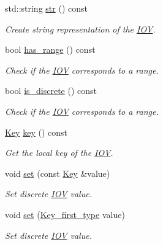 \begin{DoxyCompactItemize}
std\+::string \hyperlink{class_d_d4hep_1_1_i_o_v_a07992c19b3f256286999cf9b3edade48}{str} () const
\begin{DoxyCompactList}\small\item\em Create string representation of the \hyperlink{class_d_d4hep_1_1_i_o_v}{I\+OV}. \end{DoxyCompactList}\item 
bool \hyperlink{class_d_d4hep_1_1_i_o_v_aac9c5f6a22219991896f6a846b3f3649}{has\+\_\+range} () const
\begin{DoxyCompactList}\small\item\em Check if the \hyperlink{class_d_d4hep_1_1_i_o_v}{I\+OV} corresponds to a range. \end{DoxyCompactList}\item 
bool \hyperlink{class_d_d4hep_1_1_i_o_v_a28a460a88a706f5fa656f1e4be66e311}{is\+\_\+discrete} () const
\begin{DoxyCompactList}\small\item\em Check if the \hyperlink{class_d_d4hep_1_1_i_o_v}{I\+OV} corresponds to a range. \end{DoxyCompactList}\item 
\hyperlink{class_d_d4hep_1_1_i_o_v_a07cb46dc875296dc9cccf4ff370104ae}{Key} \hyperlink{class_d_d4hep_1_1_i_o_v_a314b969532607ee37e1f3ac27e4e6f58}{key} () const
\begin{DoxyCompactList}\small\item\em Get the local key of the \hyperlink{class_d_d4hep_1_1_i_o_v}{I\+OV}. \end{DoxyCompactList}\item 
void \hyperlink{class_d_d4hep_1_1_i_o_v_aa75452d30ebad70f84372091d6f777e4}{set} (const \hyperlink{class_d_d4hep_1_1_i_o_v_a07cb46dc875296dc9cccf4ff370104ae}{Key} \&value)
\begin{DoxyCompactList}\small\item\em Set discrete \hyperlink{class_d_d4hep_1_1_i_o_v}{I\+OV} value. \end{DoxyCompactList}\item 
void \hyperlink{class_d_d4hep_1_1_i_o_v_a8c9578e074d7c685fd7d1454b6b35d40}{set} (\hyperlink{class_d_d4hep_1_1_i_o_v_a3f518f6b507c82c4ee614e52b3519325}{Key\+\_\+first\+\_\+type} value)
\begin{DoxyCompactList}\small\item\em Set discrete \hyperlink{class_d_d4hep_1_1_i_o_v}{I\+OV} value. \end{DoxyCompactList}\item 

\end{DoxyCompactItemize}
